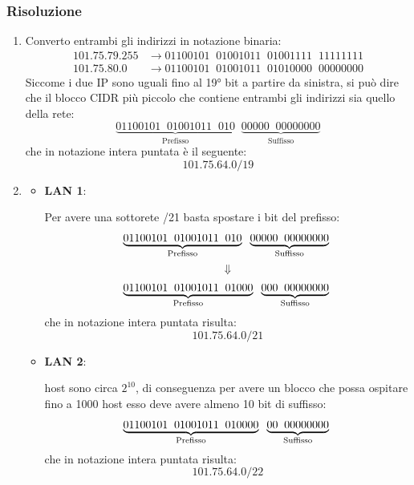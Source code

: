 \documentclass[a4paper]{article}
\begin{document}
\subsubsection{Risoluzione}
\begin{enumerate}
  \item 
    Converto entrambi gli indirizzi in notazione binaria:
    \[
      \begin{aligned}
        101.75.79.255 & \to 01100101 \;\; 01001011 \;\; 01001111 \;\; 11111111 \\
        101.75.80.0   & \to 01100101 \;\; 01001011 \;\; 01010000 \;\; 00000000
      \end{aligned}
    \] 
    Siccome i due IP sono uguali fino al 19° bit a partire da sinistra, si può dire che
    il blocco CIDR più piccolo che contiene entrambi gli indirizzi sia quello della rete:
    \[
      \underbrace{01100101 \;\; 01001011 \;\; 010}_{\text{Prefisso}}
      \;\; \underbrace{00000 \;\; 00000000}_{\text{Suffisso}}
    \]
    che in notazione intera puntata è il seguente:
    \[
      101.75.64.0/19
    \] 

  \item 
    \begin{itemize}
      \item \textbf{LAN 1}:

    \vspace{1em}
    \noindent
    Per avere una sottorete /21 basta spostare i bit del prefisso:
    \[
      \underbrace{01100101 \;\; 01001011 \;\; 010}_{\text{Prefisso}}
      \;\; \underbrace{00000 \;\; 00000000}_{\text{Suffisso}}\\
    \]
    \[
      \Downarrow
    \]
    \[
      \underbrace{01100101 \;\; 01001011 \;\; 01000}_{\text{Prefisso}}
      \;\; \underbrace{000 \;\; 00000000}_{\text{Suffisso}}\\
    \] 
    che in notazione intera puntata risulta:
    \[
      101.75.64.0/21
    \] 

  \item \textbf{LAN 2}:

    \vspace{1em}
     host sono circa \( 2^{10} \), di conseguenza per avere un blocco che possa
    ospitare fino a 1000 host esso deve avere almeno 10 bit di suffisso:
    \[
      \underbrace{01100101 \;\; 01001011 \;\; 010000}_{\text{Prefisso}}
      \;\; \underbrace{00 \;\; 00000000}_{\text{Suffisso}}\\
    \] 
    che in notazione intera puntata risulta:
    \[
      101.75.64.0/22
    \] 


\end{itemize}
\end{enumerate}
\end{document}
